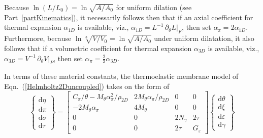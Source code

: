 Because $\ln (L/L_0) = \ln \sqrt{A / \! A_0}$ for uniform dilation (see Part~\ref{partKinematics}), it necessarily follows then that if an axial coefficient for thermal expansion $\alpha_{1D}$ is available, viz., $\alpha_{1D} = L^{-1} \, \partial_{\theta} L |_F$, then set $\alpha_{\pi} = 2 \alpha_{1D}$.  Furthermore, because $\ln \sqrt[3]{V \! / V_0} = \ln \sqrt{A / \! A_0}$ under uniform dilatation, it also follows that if a volumetric coefficient for thermal expansion $\alpha_{3D}$ is available, viz., $\alpha_{3D} = V^{-1} \, \partial_{\theta} V |_P$, then set $\alpha_{\pi} = \tfrac{2}{3} \alpha_{3D}$. 

In terms of these material constants, the thermo\-elastic membrane model of Eqn.~(\ref{Helmholtz2Duncoupled}) takes on the form of 
\begin{equation}
    \left\{ \begin{matrix}
    \mathrm{d} \eta \\ \mathrm{d} \pi \\
    \mathrm{d} \sigma \\ \mathrm{d} \tau
    \end{matrix} \right\} = \begin{bmatrix}
    C_{\pi} / \theta - M_{\theta} \alpha_{\pi}^2 / \rho_{2D} & 
    2 M_{\theta} \alpha_{\pi} / \rho_{2D} & 0 & 0 \\
    -2 M_{\theta} \alpha_{\pi} & 4 M_{\theta} & 0 & 0 \\
    0 & 0 & 2 N_{\gamma} & 2\tau \\
    0 & 0 & 2\tau & G_{\varepsilon}
    \end{bmatrix} \left\{ \begin{matrix}
    \mathrm{d} \theta \\ \mathrm{d} \xi \\
    \mathrm{d} \varepsilon \\ \mathrm{d} \gamma
    \end{matrix} \right\}
    \label{HelmholtzMembraneODEs}
\end{equation}
